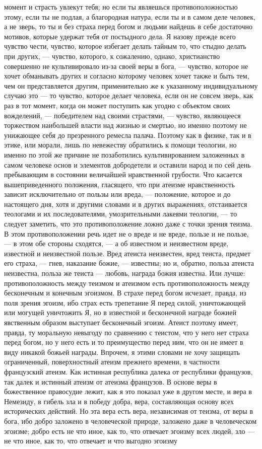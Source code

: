 \documentclass[12pt]{article}
\begin{document}
момент и страсть увлекут тебя; но если ты являешься противоположностью этому, если ты не подлая, а благородная натура, если ты и в самом деле человек, а не зверь, то ты и без страха перед богом и людьми найдешь в себе достаточно мотивов, которые удержат тебя от постыдного дела. Я назову прежде всего чувство чести, чувство, которое избегает делать тайным то, что стыдно делать при других, --- чувство, которого, к сожалению, однако, христианство совершенно не культивировало из-за своей веры в бога, --- чувство, которое не хочет обманывать других и согласно которому человек хочет также и быть тем, чем он представляется другим, применительно же к указанному индивидуальному случаю это --- то чувство, которое делает человека, если он не совсем зверь, как раз в тот момент, когда он может поступить как угодно с объектом своих вожделений, --- победителем над своими страстями, --- чувство, являющееся торжеством наибольшей власти над жизнью и смертью, но именно поэтому не унижающее себя до презренного ремесла палача. Поэтому как в физике, так и в этике, или морали, лишь по невежеству обратились к помощи теологии, но именно по этой же причине не позаботились культивированием заложенных в самом человеке основ и элементов добродетели и оставили народ и по сей день пребывающим в состоянии величайшей нравственной грубости. Что касается вышеприведенного положения, гласящего, что при атеизме нравственность зависит исключительно от пользы или вреда, --- положение, которое и до настоящего дня, хотя и другими словами и в других выражениях, отстаивается теологами и их последователями, умозрительными лакеями теологии, --- то следует заметить, что это противоположение ложно даже с точки зрения теизма. В этом противоположении речь идет не о вреде и не вреде, пользе и не пользе, --- в этом обе стороны сходятся, --- а об известном и неизвестном вреде, известной и неизвестной пользе. Вред атеиста неизвестен, вред теиста, предмет его страха, --- гнев, наказание божие, --- известны; но и, обратно, польза атеиста неизвестна, польза же теиста --- любовь, награда божия известна. Или лучше: противоположность между теизмом и атеизмом есть противоположность между бесконечным и конечным эгоизмом. В страхе перед богом исчезает, правда, из поля зрения эгоизм, ибо страх есть трепетание Я перед силой, уничтожающей или могущей уничтожить Я, но в известной и бесконечной награде божией явственным образом выступает бесконечный эгоизм. Атеист поэтому имеет, правда, ту моральную невыгоду по сравнению с теистом, что у него нет страха перед богом, но у него есть и то преимущество перед ним, что он не имеет в виду никакой божьей награды. Впрочем, я этими словами не хочу защищать ограниченный, поверхностный атеизм прежнего времени, в частности французский атеизм. Как истинная республика далека от республики французов, так далек и истинный атеизм от атеизма французов. В основе веры в божественное правосудие лежит, как я это показал уже в другом месте, и вера в Немезиду, в гибель зла и в победу добра, вера, составляющая основу всех исторических действий. Но эта вера есть вера, независимая от теизма, от веры в бога, ибо добро заложено в человеческой природе, заложено даже в человеческом эгоизме; добро есть не что иное, как то, что отвечает эгоизму всех людей, зло --- не что иное, как то, что отвечает и что выгодно эгоизму 
\end{document}
